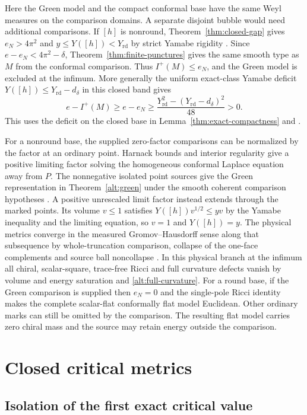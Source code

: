 Here the Green model and the compact conformal base have the same
Weyl measures on the comparison domains. A separate disjoint bubble
would need additional comparisons. If \([h]\) is nonround,
Theorem~\ref{thm:closed-gap} gives \(e_N>4\pi^2\) and
\(y\le Y([h])<Y_{\mathrm{rd}}\) by strict Yamabe rigidity
\cite[Theorem 2]{Schoen1984Yamabe}. Since
\(e-e_N<4\pi^2-\delta\), Theorem~\ref{thm:finite-punctures}
gives the same smooth type as \(M\) from the conformal comparison.
Thus \(I^+(M)\le e_N\), and the Green model is excluded at the
infimum. More generally the uniform exact-class Yamabe deficit
\(Y([h])\le Y_{\mathrm{rd}}-d_\delta\) in this closed band
gives
\[
 e-I^+(M)\ge e-e_N\ge
 \frac{Y_{\mathrm{rd}}^2-(Y_{\mathrm{rd}}-d_\delta)^2}{48}>0 .
\]
This uses the deficit on the closed base in
Lemma~\ref{thm:exact-compactness} and
\cite[\S12.2]{Baker2026TwistorSections}.

For a nonround base, the supplied zero-factor comparisons can be
normalized by the factor at an ordinary point. Harnack bounds and
interior regularity give a positive limiting factor solving the
homogeneous conformal Laplace equation away from \(P\). The
nonnegative isolated point sources give the Green representation
in Theorem~\ref{alt:green} under the smooth coherent comparison
hypotheses \cite{Baker2026MarkedLimits}. A positive unrescaled
limit factor instead extends through the marked points. Its
volume \(v\le1\) satisfies \(Y([h])v^{1/2}\le yv\) by the
Yamabe inequality and the limiting equation, so \(v=1\) and
\(Y([h])=y\). The physical metrics converge in the measured
Gromov--Hausdorff sense along that subsequence by whole-truncation
comparison, collapse of the one-face complements and source
ball noncollapse \cite{Baker2026MarkedLimits}.
In this physical branch at the infimum all chiral,
scalar-square, trace-free Ricci and full curvature defects vanish
by volume and energy saturation and \eqref{alt:full-curvature}.
For a round base, if the Green comparison is supplied then
\(e_N=0\) and the single-pole Ricci identity makes the complete
scalar-flat conformally flat model Euclidean. Other ordinary
marks can still be omitted by the comparison. The resulting
flat model carries zero chiral mass and the source may retain
energy outside the comparison.

\section{Closed critical metrics}
\label{alt:closed}

\subsection{Isolation of the first exact critical value}

